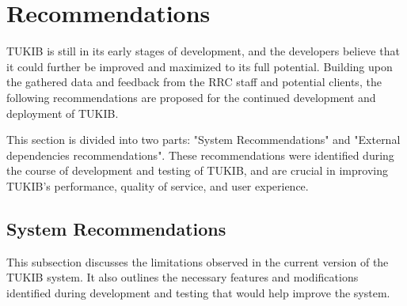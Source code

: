 \section{Recommendations}

TUKIB is still in its early stages of development, and the developers believe
that it could further be improved and maximized to its full potential. Building upon the gathered data and feedback from the RRC staff and potential clients, the following recommendations are proposed for the continued development and deployment of TUKIB. 

This section is divided into two parts: "System Recommendations" and "External dependencies recommendations". These recommendations were identified during the course of development and testing of TUKIB, and are crucial in improving TUKIB's performance, quality of service, and user experience.

\subsection{System Recommendations}

This subsection discusses the limitations observed in the current version of the TUKIB system. It also outlines the necessary features and modifications identified during development and testing that would help improve the system.

